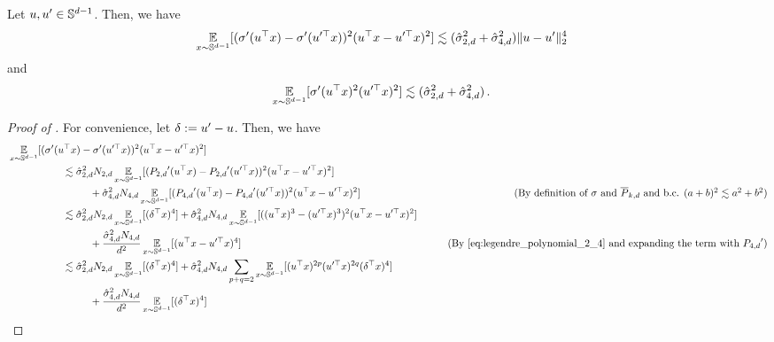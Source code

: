 \begin{lemma} \label{lemma:sigma_dot_product_bound}
Let $u, u' \in \mathbb{S}^{d - 1}$. Then, we have
\begin{align} \label{eq:at_5}
\operatorname*{\mathbb{E}}_{x \sim \mathbb{S}^{d - 1}} [(\sigma'(u^\top x) - \sigma'(u'^\top x))^2 (u^\top x - u'^\top x)^2]
& \lesssim (\hat{\sigma}_{2, d}^2 + \hat{\sigma}_{4, d}^2) \|u - u'\|_2^4
\end{align}
and
\begin{align} \label{eq:sigma_dp_2}
\operatorname*{\mathbb{E}}_{x \sim \mathbb{S}^{d - 1}} [\sigma'(u^\top x)^2 (u'^\top x)^2]
& \lesssim (\hat{\sigma}_{2, d}^2 + \hat{\sigma}_{4, d}^2) \,.
\end{align}
\end{lemma}
\begin{proof}[Proof of ]
For convenience, let $\delta := u' - u$. Then, we have
    \begin{align}
    & \E_{x \sim \bbS^{d - 1}} [(\sigma'(\u^\top x) - \sigma'(\u'^\top x))^2 (\u^\top x - \u'^\top x)^2] \\
    & \nextlinespace\nextlinespace \lesssim \sigmaCoeffTwo^2 N_{2, d} \E_{x \sim \bbS^{d - 1}} [(\PtwoD'(\u^\top x) - \PtwoD'(\u'^\top x))^2 (\u^\top x - \u'^\top x)^2] \\
    & \nextlinespace\nextlinespace\nextlinespace + \sigmaCoeffFour^2 N_{4, d} \E_{x \sim \bbS^{d - 1}} [(\PfourD'(\u^\top x) - \PfourD'(\u'^\top x))^2 (\u^\top x - \u'^\top x)^2]
    & \tag{By definition of $\sigma$ and $\Pkdbar$ and b.c. $(a + b)^2 \lesssim a^2 + b^2$} \\
    & \nextlinespace\nextlinespace \lesssim \sigmaCoeffTwo^2 N_{2, d} \E_{x \sim \bbS^{d - 1}} [(\vv^\top x)^4] + \sigmaCoeffFour^2 N_{4, d} \E_{x \sim \bbS^{d - 1}} [((\u^\top x)^3 - (\u'^\top x)^3)^2 (\u^\top x - \u'^\top x)^2] \\
    & \nextlinespace\nextlinespace\nextlinespace + \frac{\sigmaCoeffFour^2 N_{4, d}}{d^2} \E_{x \sim \bbS^{d - 1}} [(\u^\top x - \u'^\top x)^4]
    & \tag{By \Cref{eq:legendre_polynomial_2_4} and expanding the term with $\PfourD'$} \\
    & \nextlinespace\nextlinespace \lesssim \sigmaCoeffTwo^2 N_{2, d} \E_{x \sim \bbS^{d - 1}} [(\vv^\top x)^4] + \sigmaCoeffFour^2 N_{4, d} \sum_{p + q = 2} \E_{x \sim \bbS^{d - 1}} [(\u^\top x)^{2p} (\u'^\top x)^{2q} (\vv^\top x)^4] \\
    & \nextlinespace\nextlinespace\nextlinespace + \frac{\sigmaCoeffFour^2 N_{4, d}}{d^2} \E_{x \sim \bbS^{d - 1}} [(\vv^\top x)^4] \label{eq:sphere_dp_exp}

\end{align}
\end{proof}
